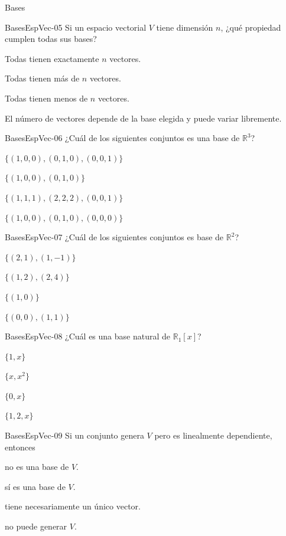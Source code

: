 \documentclass[a4,11pt]{aleph-notas}
\begin{document}
\begin{quiz}{Bases}
\begin{multi}[]%
    {BasesEspVec-05}
    Si un espacio vectorial \(V\) tiene dimensión \(n\), ¿qué propiedad cumplen todas sus bases?
    \item* Todas tienen exactamente \(n\) vectores.
    \item Todas tienen más de \(n\) vectores.
    \item Todas tienen menos de \(n\) vectores.
    \item El número de vectores depende de la base elegida y puede variar libremente.
\end{multi}

\begin{multi}[]%
    {BasesEspVec-06}
    ¿Cuál de los siguientes conjuntos es una base de \(\mathbb{R}^3\)?
    \item* \(\{(1,0,0),(0,1,0),(0,0,1)\}\)
    \item \(\{(1,0,0),(0,1,0)\}\)
    \item \(\{(1,1,1),(2,2,2),(0,0,1)\}\)
    \item \(\{(1,0,0),(0,1,0),(0,0,0)\}\)
\end{multi}

\begin{multi}[]%
    {BasesEspVec-07}
    ¿Cuál de los siguientes conjuntos es base de \(\mathbb{R}^2\)?
    \item* \(\{(2,1),(1,-1)\}\)
    \item \(\{(1,2),(2,4)\}\)
    \item \(\{(1,0)\}\)
    \item \(\{(0,0),(1,1)\}\)
\end{multi}

\begin{multi}[]%
    {BasesEspVec-08}
    ¿Cuál es una base natural de \(\mathbb{R}_1[x]\)?
    \item* \(\{1,x\}\)
    \item \(\{x,x^2\}\)
    \item \(\{0,x\}\)
    \item \(\{1,2,x\}\)
\end{multi}

\begin{multi}[]%
    {BasesEspVec-09}
    Si un conjunto genera \(V\) pero es linealmente dependiente, entonces
    \item* no es una base de \(V\).
    \item sí es una base de \(V\).
    \item tiene necesariamente un único vector.
    \item no puede generar \(V\).
\end{multi}


\end{quiz}
\end{document}

